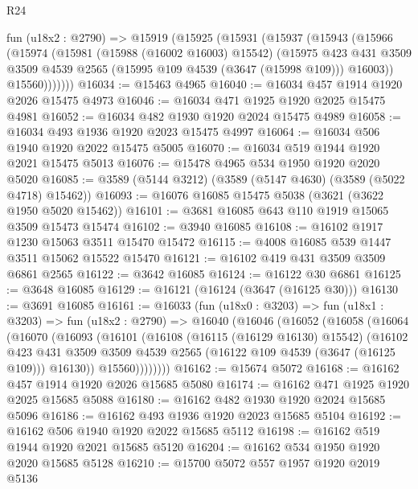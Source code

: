 \begin{lexlean}{R24}
\begin{coremodule}
    fun (u18x2 : @2790) =>
    @15919
      (@15925
        (@15931
          (@15937
            (@15943
              (@15966
                (@15974
                  (@15981
                    (@15988 (@16002 @16003) @15542)
                    (@15975
                      @423
                      @431
                      @3509
                      @3509
                      @4539
                      @2565
                      (@15995 @109 @4539 (@3647 (@15998 @109)))
                      @16003))
                  @15560)))))))
@16034 := @15463 @4965
@16040 := @16034 @457 @1914 @1920 @2026 @15475 @4973
@16046 := @16034 @471 @1925 @1920 @2025 @15475 @4981
@16052 := @16034 @482 @1930 @1920 @2024 @15475 @4989
@16058 := @16034 @493 @1936 @1920 @2023 @15475 @4997
@16064 := @16034 @506 @1940 @1920 @2022 @15475 @5005
@16070 := @16034 @519 @1944 @1920 @2021 @15475 @5013
@16076 := @15478 @4965 @534 @1950 @1920 @2020 @5020
@16085 := @3589 (@5144 @3212) (@3589 (@5147 @4630) (@3589 (@5022 @4718) @15462))
@16093 := @16076 @16085 @15475 @5038 (@3621 (@3622 @1950 @5020 @15462))
@16101 := @3681 @16085 @643 @110 @1919 @15065 @3509 @15473 @15474
@16102 := @3940 @16085
@16108 := @16102 @1917 @1230 @15063 @3511 @15470 @15472
@16115 := @4008 @16085 @539 @1447 @3511 @15062 @15522 @15470
@16121 := @16102 @419 @431 @3509 @3509 @6861 @2565
@16122 := @3642 @16085
@16124 := @16122 @30 @6861
@16125 := @3648 @16085
@16129 := @16121 (@16124 (@3647 (@16125 @30)))
@16130 := @3691 @16085
@16161 := @16033
    (fun (u18x0 : @3203) =>
    fun (u18x1 : @3203) =>
    fun (u18x2 : @2790) =>
    @16040
      (@16046
        (@16052
          (@16058
            (@16064
              (@16070
                (@16093
                  (@16101
                    (@16108
                      (@16115 (@16129 @16130) @15542)
                      (@16102
                        @423
                        @431
                        @3509
                        @3509
                        @4539
                        @2565
                        (@16122 @109 @4539 (@3647 (@16125 @109)))
                        @16130))
                    @15560))))))))
@16162 := @15674 @5072
@16168 := @16162 @457 @1914 @1920 @2026 @15685 @5080
@16174 := @16162 @471 @1925 @1920 @2025 @15685 @5088
@16180 := @16162 @482 @1930 @1920 @2024 @15685 @5096
@16186 := @16162 @493 @1936 @1920 @2023 @15685 @5104
@16192 := @16162 @506 @1940 @1920 @2022 @15685 @5112
@16198 := @16162 @519 @1944 @1920 @2021 @15685 @5120
@16204 := @16162 @534 @1950 @1920 @2020 @15685 @5128
@16210 := @15700 @5072 @557 @1957 @1920 @2019 @5136

\end{coremodule}
\end{lexlean}
